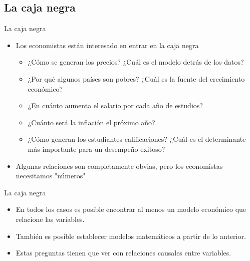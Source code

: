 \subsection{La caja negra}
\begin{frame}{La caja negra}
	\begin{itemize}
		\item Los economistas están interesado en entrar en la caja negra
			\begin{itemize}\pause
				\item ¿Cómo se generan los precios? ¿Cuál es el modelo detrás de los datos?\pause
				\item ¿Por qué algunos países son pobres? ¿Cuál es la fuente del crecimiento económico?\pause
				\item ¿En cuánto aumenta el salario por cada año de estudios?\pause
				\item ¿Cuánto será la inflación el próximo año? \pause
				\item ¿Cómo generan los estudiantes calificaciones? ¿Cuál es el determinante más importante para un desempeño exitoso?\pause
			\end{itemize}
		\item Algunas relaciones son completamente obvias, pero los economistas necesitamos "números"
	\end{itemize}
\end{frame}
\begin{frame}{La caja negra}
	\begin{itemize}[<+>]
		\item En todos los casos es posible encontrar al menos un modelo económico que relacione las variables.
		\item También es posible establecer modelos matemáticos a partir de lo anterior. 
		\item Estas preguntas tienen que ver con relaciones causales entre variables.
	\end{itemize}
\end{frame}